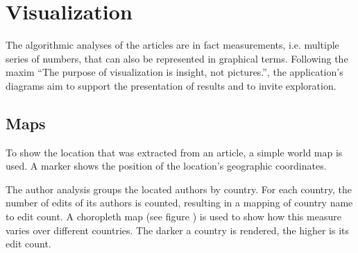 \section{Visualization}\label{sec:visualization}

The algorithmic analyses of the articles are in fact measurements, i.e. multiple series of numbers, that can also be represented in graphical terms.
Following the maxim ``The purpose of visualization is insight, not pictures.''\cite[6]{card1999readings}, the application's diagrams aim to support the presentation of results and to invite exploration.


\subsection{Maps}

To show the location that was extracted from an article, a simple world map is used.
A marker shows the position of the location's geographic coordinates.


The author analysis groups the located authors by country. 
For each country, the number of edits of its authors is counted, resulting in a mapping of country name to edit count.
A choropleth map (see figure ) is used to show how this measure varies over different countries.
The darker a country is rendered, the higher is its edit count.

